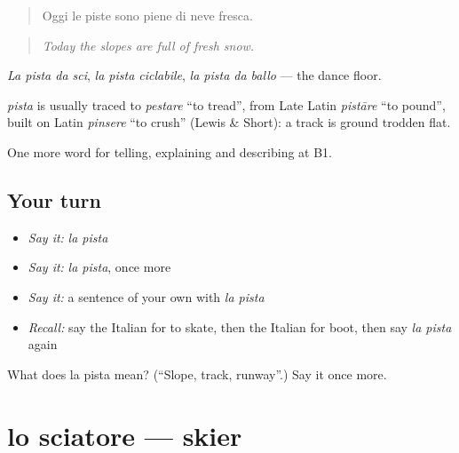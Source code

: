 \begin{quote}
Oggi le piste sono piene di neve fresca.
\end{quote}

\begin{quote}
\emph{Today the slopes are full of fresh snow.}
\end{quote}

\emph{La pista da sci}, \emph{la pista ciclabile}, \emph{la pista da ballo} — the dance floor.

\begin{cousinweb}
\emph{pista} is usually traced to \emph{pestare} \textquotedblleft{}to tread\textquotedblright{}, from Late Latin \emph{pistāre} \textquotedblleft{}to pound\textquotedblright{}, built on Latin \emph{pinsere} \textquotedblleft{}to crush\textquotedblright{} (Lewis \& Short): a track is ground trodden flat.
\end{cousinweb}

\begin{grammarlens}[title={What you've built}]
One more word for telling, explaining and describing at B1.
\end{grammarlens}

\subsection*{Your turn}
\begin{itemize}
\raggedright
  \item \emph{Say it:} \emph{la pista}
  \item \emph{Say it:} \emph{la pista}, once more
  \item \emph{Say it:} a sentence of your own with \emph{la pista}
  \item \emph{Recall:} say the Italian for to skate, then the Italian for boot, then say \emph{la pista} again
\end{itemize}

\begin{tcolorbox}[breakable,colback=teal!4,colframe=teal!35!black,title={Before you move on}]
What does la pista mean? (\textquotedblleft{}Slope, track, runway\textquotedblright{}.) Say it once more.
\end{tcolorbox}
\section[lo sciatore]{lo sciatore — skier}

\label{lesson:IT-C515-sciatore}



